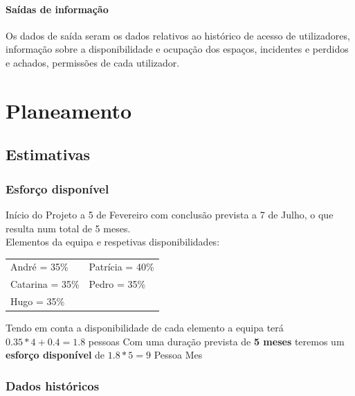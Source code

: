 \documentclass[a4paper]{report}
\begin{document}
\subsubsection*{Saídas de informação}
	Os dados de saída seram os dados relativos ao histórico de acesso de utilizadores, informação sobre a disponibilidade e ocupação dos espaços, incidentes e perdidos e achados, permissões de cada utilizador.  
\chapter{Planeamento}
\section{Estimativas}
\subsection{Esforço disponível}
Início do Projeto a 5 de Fevereiro com conclusão prevista a 7 de Julho, o que resulta num total de 5 meses.\\
Elementos da equipa e respetivas disponibilidades:\\

\begin{tabularx}{\textwidth}{XX}
	André = 35\%    & Patrícia = 40\% \\
	Catarina = 35\% & Pedro = 35\%    \\
	Hugo = 35\%     &
\end{tabularx}
\linebreak\linebreak
Tendo em conta a disponibilidade de cada elemento a equipa terá $0.35*4 + 0.4 =1.8$ pessoas\linebreak
Com uma duração prevista de \textbf{5 meses} teremos um \textbf{esforço disponível} de $1.8*5=9$ Pessoa Mes
\subsection{Dados históricos}
\end{document}
